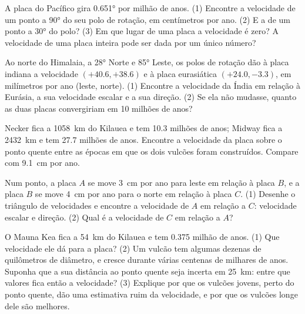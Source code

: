 \begin{exercise}[$\star\star$]\label{exo:g11:plate-motions:8}
A placa do Pacífico gira \ang{0.651} por milhão de anos. (1) Encontre a
velocidade de um ponto a \ang{90} do seu polo de rotação, em centímetros por
ano. (2) E a de um ponto a \ang{30} do polo? (3) Em que lugar de uma placa a
velocidade é zero? A velocidade de uma placa inteira pode ser dada por um
único número?
\end{exercise}

\begin{exercise}[$\star\star$]\label{exo:g11:plate-motions:9}
Ao norte do Himalaia, a \ang{28} Norte e \ang{85} Leste, os polos de
rotação dão à placa indiana a velocidade $(+40.6, +38.6)$ e à placa
eurasiática $(+24.0, -3.3)$, em milímetros por ano (leste, norte).
(1) Encontre a velocidade da Índia em relação à Eurásia, a sua velocidade
escalar e a sua direção. (2) Se ela não mudasse, quanto as duas placas
convergiriam em 10 milhões de anos?
\end{exercise}

\begin{exercise}[$\star\star$]\label{exo:g11:plate-motions:10}
Necker fica a \qty{1058}{km} do Kilauea e tem \num{10.3} milhões de anos;
Midway fica a \qty{2432}{km} e tem \num{27.7} milhões de anos. Encontre a
velocidade da placa sobre o ponto quente entre as épocas em que os dois
vulcões foram construídos. Compare com \qty{9.1}{cm} por ano.
\end{exercise}

\begin{exercise}[$\star\star$]\label{exo:g11:plate-motions:11}
Num ponto, a placa $A$ se move \qty{3}{cm} por ano para leste em relação à
placa $B$, e a placa $B$ se move \qty{4}{cm} por ano para o norte em relação
à placa $C$. (1) Desenhe o triângulo de velocidades e encontre a velocidade
de $A$ em relação a $C$: velocidade escalar e direção. (2) Qual é a
velocidade de $C$ em relação a $A$?
\end{exercise}

\begin{exercise}[$\star\star\star$]\label{exo:g11:plate-motions:12}
O Mauna Kea fica a \qty{54}{km} do Kilauea e tem \num{0.375} milhão de anos.
(1) Que velocidade ele dá para a placa? (2) Um vulcão tem algumas dezenas de
quilômetros de diâmetro, e cresce durante várias centenas de milhares de
anos. Suponha que a sua distância ao ponto quente seja incerta em
\qty{25}{km}: entre que valores fica então a velocidade? (3) Explique por
que os vulcões jovens, perto do ponto quente, dão uma estimativa ruim da
velocidade, e por que os vulcões longe dele são melhores.
\end{exercise}

